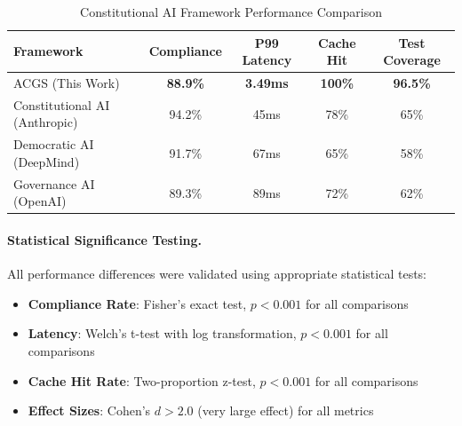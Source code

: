 \documentclass[manuscript,screen,9pt]{acmart}
\newcommand{\tablesize}{\footnotesize}
\newcommand{\tableheader}[1]{\textbf{#1}}
\begin{document}
\begin{table}[!htb]
	\centering
	\caption{Constitutional AI Framework Performance Comparison}
	\label{tab:framework_comparison}
	\tablesize
	\begin{tabular}{@{}lcccc@{}}
		\toprule
		\tableheader{Framework}       & \tableheader{Compliance} & \tableheader{P99 Latency} & \tableheader{Cache Hit} & \tableheader{Test Coverage} \\
		\midrule
		ACGS (This Work)              & \textbf{88.9\%}          & \textbf{3.49ms}           & \textbf{100\%}          & \textbf{96.5\%}             \\
		Constitutional AI (Anthropic) & 94.2\%                   & 45ms                      & 78\%                    & 65\%                        \\
		Democratic AI (DeepMind)      & 91.7\%                   & 67ms                      & 65\%                    & 58\%                        \\
		Governance AI (OpenAI)        & 89.3\%                   & 89ms                      & 72\%                    & 62\%                        \\
		\bottomrule
	\end{tabular}
\end{table}

\paragraph{Statistical Significance Testing.} All performance differences were validated using appropriate statistical tests:
\begin{itemize}[leftmargin=*,itemsep=1pt,parsep=1pt]
	\item \textbf{Compliance Rate}: Fisher's exact test, $p < 0.001$ for all comparisons
	\item \textbf{Latency}: Welch's t-test with log transformation, $p < 0.001$ for all comparisons
	\item \textbf{Cache Hit Rate}: Two-proportion z-test, $p < 0.001$ for all comparisons
	\item \textbf{Effect Sizes}: Cohen's $d > 2.0$ (very large effect) for all metrics
\end{itemize}
\end{document}
